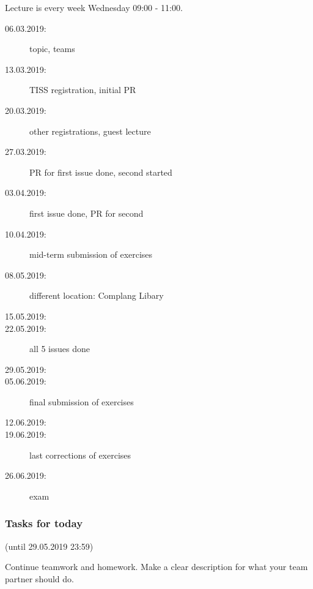 


\date{29.5.2018}



\renewcommand{\enquote}[1]{\emph{``#1''}} %

\begin{frame}
	\titlepage
	\doclicenseThis
\end{frame}

\begin{frame}
	Lecture is every week Wednesday 09:00 - 11:00.

	\begin{description}
		\item[06.03.2019:] {\color{gray}topic, teams}
		\item[13.03.2019:] {\color{gray}TISS registration, initial PR}
		\item[20.03.2019:] {\color{gray}other registrations, guest lecture}
		\item[27.03.2019:] {\color{gray}PR for first issue done, second started}
		\item[03.04.2019:] {\color{gray}first issue done, PR for second}
		\item[10.04.2019:] {\color{gray}mid-term submission of exercises}
		\item[08.05.2019:] {\color{gray}different location: Complang Libary}
		\item[15.05.2019:]
		\item[22.05.2019:] {\color{gray}all 5 issues done}
		\item[29.05.2019:]
		\item[05.06.2019:] final submission of exercises
		\item[12.06.2019:]
		\item[19.06.2019:] last corrections of exercises
		\item[26.06.2019:] exam
	\end{description}
\end{frame}

\begin{assignment}
	\frametitle{Tasks for today}
	(until 29.05.2019 23:59)

	\begin{task}
	Continue teamwork and homework.
	Make a clear description for what your team partner should do.
	\end{task}
\end{assignment}

